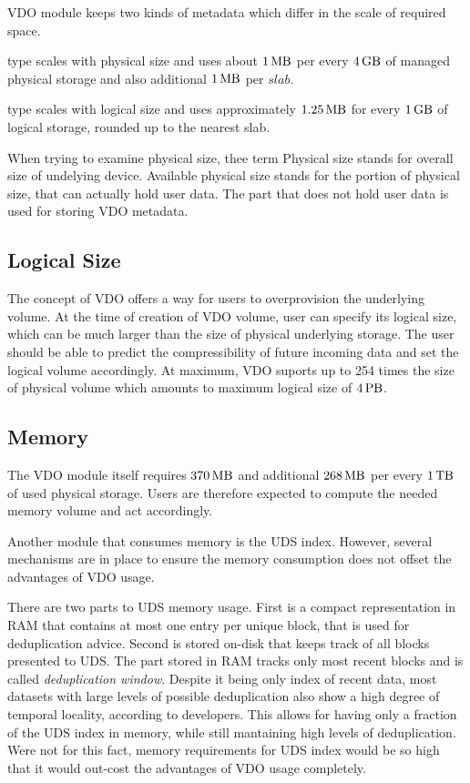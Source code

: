 \documentclass[
  color, %
  table, %
  lof,   %
  lot,   %
]{fithesis3}
\begin{document}
VDO module keeps two kinds of metadata which differ in the scale of required space.
\begin{compactenum}
\item type scales with physical size and uses about $\SI{1}{\mega\byte}$ per every $\SI{4}{\giga\byte}$ of managed physical storage and also additional $\SI{1}{\mega\byte}$ per $slab$. 
\item type scales with logical size and uses approximately $\SI{1.25}{\mega\byte}$ for every $\SI{1}{\giga\byte}$ of logical storage, rounded up to the nearest slab.
\end{compactenum}

When trying to examine physical size, thee term Physical size stands for overall size of undelying device. Available physical size stands for the portion of physical size, that can actually hold user data. The part that does not hold user data is used for storing VDO metadata.

\subsection{Logical Size}
The concept of VDO offers a way for users to overprovision the underlying volume. At the time of creation of VDO volume, user can specify its logical size, which can be much larger than the size of physical underlying storage. The user should be able to predict the compressibility of future incoming data and set the logical volume accordingly. At maximum, VDO suports up to 254 times the size of physical volume which amounts to maximum logical size of $\SI{4}{\peta\byte}$.

\subsection{Memory}
The VDO module itself requires $\SI{370}{\mega\byte}$ and additional $\SI{268}{\mega\byte}$ per every $\SI{1}{\tera\byte}$ of used physical storage. Users are therefore expected to compute the needed memory volume and act accordingly.

Another module that consumes memory is the UDS index. However, several mechanisms are in place to ensure the memory consumption does not offset the advantages of VDO usage.

There are two parts to UDS memory usage. First is a compact representation in RAM that contains at most one entry per unique block, that is used for deduplication advice. Second is stored on-disk that keeps track of all blocks presented to UDS. The part stored in RAM tracks only most recent blocks and is called \emph{deduplication window}. Despite it being only index of recent data, most datasets with large levels of possible deduplication also show a high degree of temporal locality, according to developers. This allows for having only a fraction of the UDS index in memory, while still mantaining high levels of deduplication. Were not for this fact, memory requirements for UDS index would be so high that it would out-cost the advantages of VDO usage completely.
\end{document}
